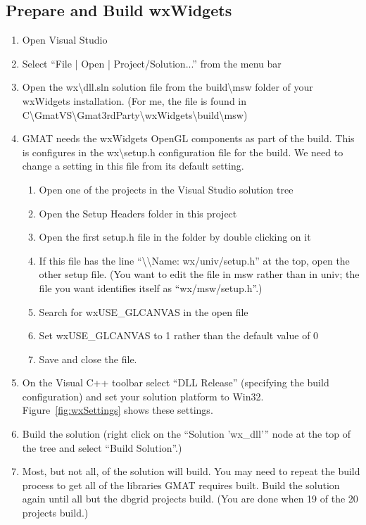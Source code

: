 \documentclass[letterpaper,10pt]{article}%
\begin{document}
\subsection{Prepare and Build wxWidgets}
\begin{enumerate}
\item Open Visual Studio
\item Select ``File | Open | Project/Solution...'' from the menu bar
\item Open the wx\textbackslash dll.sln solution file from the build\textbackslash msw folder of your wxWidgets installation.  (For me, the file is found in  C\:\textbackslash GmatVS\textbackslash Gmat3rdParty\textbackslash wxWidgets\textbackslash build\textbackslash msw)
\item GMAT needs the wxWidgets OpenGL components as part of the build.  This is configures in the wx\textbackslash setup.h configuration file for the build.  We need to change a setting in this file from its default setting.
\begin{enumerate}
	\item Open one of the projects in the Visual Studio solution tree
	\item Open the Setup Headers folder in this project
	\item Open the first setup.h file in the folder by double clicking on it
	\item If this file has the line ``\textbackslash\textbackslash  Name:        wx/univ/setup.h'' at the top, open the other setup file. (You want to edit the file in msw rather than in univ; the file you want identifies itself as ``wx/msw/setup.h''.)
	\item Search for wxUSE\_GLCANVAS in the open file
	\item Set wxUSE\_GLCANVAS to 1 rather than the default value of 0
	\item Save and close the file.
\end{enumerate}
\item On the Visual C++ toolbar select ``DLL Release'' (specifying the build configuration) and set your solution platform to Win32.  Figure~\ref{fig:wxSettings} shows these settings.
\item Build the solution (right click on the ``Solution 'wx\_dll'{}'' node at the top of the tree and select ``Build Solution''.)
\item Most, but not all, of the solution will build.  You may need to repeat the build process to get all of the libraries GMAT requires built.  Build the solution again until all but the dbgrid projects build.  (You are done when 19 of the 20 projects build.)
\end{enumerate}
\end{document}
